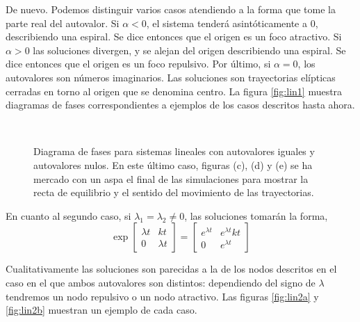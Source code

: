 De nuevo. Podemos distinguir varios casos atendiendo a la forma que tome la parte real del autovalor. Si $\alpha < 0$, el sistema tenderá asintóticamente a 0, describiendo una espiral. Se dice entonces que el origen es un foco atractivo. Si $\alpha > 0$ las soluciones divergen, y se alejan del origen describiendo una espiral. Se dice entonces que el origen es un foco repulsivo. Por último, si $\alpha = 0$, los autovalores son números imaginarios. Las soluciones son trayectorias elípticas cerradas en torno al origen que se denomina centro. La figura \ref{fig:lin1} muestra diagramas de fases correspondientes a ejemplos de los casos descritos hasta ahora.

\begin{figure}
\centering
{}
\\
\caption{Diagrama de fases para sistemas lineales con autovalores iguales y autovalores nulos. En este último caso, figuras (c), (d) y (e) se ha mercado con un aspa el final de las simulaciones para mostrar la recta de equilibrio y el sentido del movimiento de las trayectorias. }\label{fig:lin2}
\end{figure}

En cuanto al segundo caso, si $\lambda_1 = \lambda_2 \ne 0$, las soluciones tomarán la forma,
\begin{equation}
\exp\begin{bmatrix}
\lambda t& kt\\ 0 & \lambda t
\end{bmatrix} = 
\begin{bmatrix}
e^{\lambda t} & e^{\lambda t}kt\\
0 & e^{\lambda t}
\end{bmatrix}
\end{equation}

Cualitativamente las soluciones son parecidas a la de los nodos descritos en el caso en el que ambos autovalores son distintos: dependiendo del signo de $\lambda$ tendremos un nodo repulsivo o un nodo atractivo. Las figuras \ref{fig:lin2a} y \ref{fig:lin2b} muestran un ejemplo de cada caso. 

